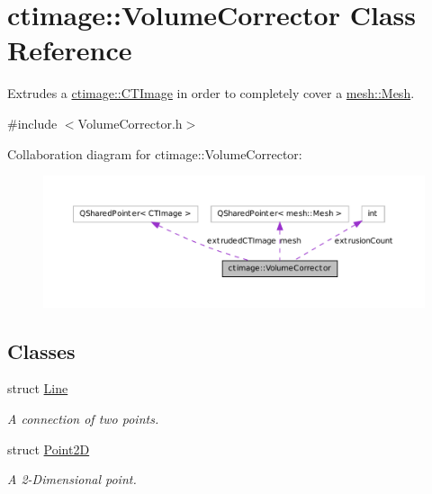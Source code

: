 \hypertarget{classctimage_1_1_volume_corrector}{
\section{ctimage::VolumeCorrector Class Reference}
\label{classctimage_1_1_volume_corrector}
}


Extrudes a \hyperlink{classctimage_1_1_c_t_image}{ctimage::CTImage} in order to completely cover a \hyperlink{classmesh_1_1_mesh}{mesh::Mesh}.  




{\ttfamily \#include $<$VolumeCorrector.h$>$}



Collaboration diagram for ctimage::VolumeCorrector:\nopagebreak
\begin{figure}[H]
\begin{center}
\leavevmode
\includegraphics[width=400pt]{classctimage_1_1_volume_corrector__coll__graph}
\end{center}
\end{figure}
\subsection*{Classes}
\begin{DoxyCompactItemize}
\item 
struct \hyperlink{structctimage_1_1_volume_corrector_1_1_line}{Line}
\begin{DoxyCompactList}\small\item\em A connection of two points. \item\end{DoxyCompactList}\item 
struct \hyperlink{structctimage_1_1_volume_corrector_1_1_point2_d}{Point2D}
\begin{DoxyCompactList}\small\item\em A 2-\/Dimensional point. \item\end{DoxyCompactList}\end{DoxyCompactItemize}
